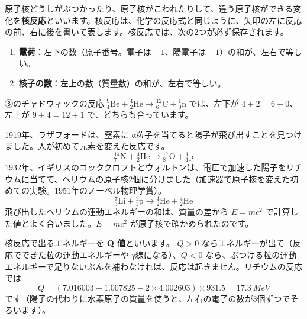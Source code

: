 \label{ph:原-11:sec6}
原子核どうしがぶつかったり、原子核がこわれたりして、違う原子核ができる変化を\textbf{核反応}といいます。核反応は、化学の反応式と同じように、矢印の左に反応の前、右に後を書いて表します。核反応では、次の2つが必ず保存されます。
\begin{enumerate}[label={\bkcircled{\arabic*}}, leftmargin=2.4\zw, itemsep=1pt, topsep=2pt]
\item \textbf{電荷}：左下の数（原子番号。電子は $-1$、陽電子は $+1$）の和が、左右で等しい。
\item \textbf{核子の数}：左上の数（質量数）の和が、左右で等しい。
\end{enumerate}
③のチャドウィックの反応 ${}^{9}_{4}\mathrm{Be}+{}^{4}_{2}\mathrm{He}\to{}^{12}_{6}\mathrm{C}+{}^{1}_{0}\mathrm{n}$ では、左下が $4+2=6+0$、左上が $9+4=12+1$ で、どちらも合っています。

\noindent 1919年、ラザフォードは、窒素に α粒子を当てると陽子が飛び出すことを見つけました。人が初めて元素を変えた反応です。
\[ {}^{14}_{7}\mathrm{N}+{}^{4}_{2}\mathrm{He}\longrightarrow{}^{17}_{8}\mathrm{O}+{}^{1}_{1}\mathrm{p} \]
1932年、イギリスのコッククロフトとウォルトンは、電圧で加速した陽子をリチウムに当てて、ヘリウムの原子核2個に分けました（加速器で原子核を変えた初めての実験。1951年のノーベル物理学賞）。
\[ {}^{7}_{3}\mathrm{Li}+{}^{1}_{1}\mathrm{p}\longrightarrow{}^{4}_{2}\mathrm{He}+{}^{4}_{2}\mathrm{He} \]
飛び出したヘリウムの運動エネルギーの和は、質量の差から $E=mc^2$ で計算した値とよく合いました。$E=mc^2$ が原子核で確かめられたのです。

核反応で出るエネルギーを \textbf{Q 値}といいます。
$Q>0$ ならエネルギーが出て（反応でできた粒の運動エネルギーや γ線になる）、$Q<0$ なら、ぶつける粒の運動エネルギーで足りないぶんを補わなければ、反応は起きません。リチウムの反応では
\[ Q=(7.016003+1.007825-2\times4.002603)\times931.5=\qty{17.3}{MeV} \]
です（陽子の代わりに水素原子の質量を使うと、左右の電子の数が3個ずつでそろいます）。

\begin{phflow}
\end{phflow}

